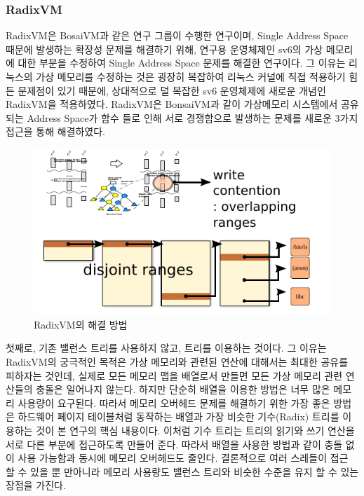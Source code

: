
\subsubsection{RadixVM}

RadixVM은 BosaiVM과 같은 연구 그룹이 수행한 연구이며, 
Single Address Space 때문에 발생하는 확장성 문제를 해결하기 위해, 연구용 운영체제인 sv6의 가상 메모리에 
대한 부분을 수정하여 Single Address Space 문제를 해결한 연구이다.
그 이유는 리눅스의 가상 메모리를 수정하는 것은 굉장히 복잡하여 리눅스 커널에 직접 적용하기 힘든 문제점이 
있기 때문에, 상대적으로 덜 복잡한 sv6 운영체제에 새로운 개념인 RadixVM을 적용하였다. 
RadixVM은 BonsaiVM과 같이 가상메모리 시스템에서 공유되는 Address Space가  함수 들로 인해 서로 경쟁함으로 발생하는 문제를 새로운 3가지 접근을 통해 해결하였다. 

\begin{figure}[h!]
    \centering
    \includegraphics[width=1\textwidth]{fig/radix/radix}
    \caption{RadixVM의 해결 방법}
  \label{fig:radix}
\end{figure}

첫째로, 기존 밸런스 트리를 사용하지 않고,  트리를 이용하는 것이다. 
그 이유는 RadixVM의 궁극적인 목적은 가상 메모리와 관련된 연산에 대해서는 최대한 공유를 피하자는 것인데, 
실제로 모든 메모리 맵을 배열로서 만들면 모든 가상 메모리 관련 연산들의 충돌은 일어나지 않는다. 
하지만 단순히 배열을 이용한 방법은 너무 많은 메모리 사용량이 요구된다.
따라서 메모리 오버헤드 문제를 해결하기 위한 가장 좋은 방법은 하드웨어 페이지 테이블처럼 동작하는 
배열과 가장 비슷한 기수(Radix) 트리를 이용하는 것이 본 연구의 핵심 내용이다. 
이처럼 기수 트리는 트리의 읽기와 쓰기 연산을 서로 다른 부분에 접근하도록 만들어 준다.
따라서 배열을 사용한 방법과 같이 충돌 없이 사용 가능함과 동시에 메모리 오버헤드도 줄인다. 
결론적으로 여러 스레들이 접근 할 수 있을 뿐 만아니라 메모리 사용량도 밸런스 트리와 비슷한 
수준을 유지 할 수 있는 장점을 가진다.

